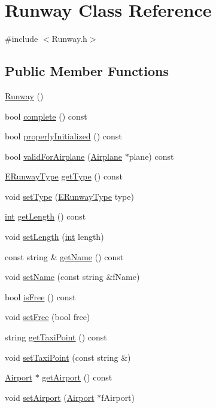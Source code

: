 \hypertarget{classRunway}{}\section{Runway Class Reference}
\label{classRunway}


{\ttfamily \#include $<$Runway.\+h$>$}

\subsection*{Public Member Functions}
\begin{DoxyCompactItemize}
\item 
\hyperlink{classRunway_a75b9355b4953bd430f7c6ea0a18b465a}{Runway} ()
\item 
bool \hyperlink{classRunway_a3f905e251e1c7941690cf89c1fabd04c}{complete} () const 
\item 
bool \hyperlink{classRunway_ab1eb6649c04ead1c6ba6405b0d6e2a9f}{properly\+Initialized} () const 
\item 
bool \hyperlink{classRunway_a54aa6c5f9054cc5d16c10257c641f997}{valid\+For\+Airplane} (\hyperlink{classAirplane}{Airplane} $\ast$plane) const 
\item 
\hyperlink{Runway_8h_adbb3e23fdb96fa1bac0dbbae33431cd2}{E\+Runway\+Type} \hyperlink{classRunway_a6d936a840916f8a5fe01551622cf6c46}{get\+Type} () const 
\item 
void \hyperlink{classRunway_a0a95f11d67cb4677f1bddd8cf20ed5bc}{set\+Type} (\hyperlink{Runway_8h_adbb3e23fdb96fa1bac0dbbae33431cd2}{E\+Runway\+Type} type)
\item 
\hyperlink{CMakeCache_8txt_a79a3d8790b2588b09777910863574e09}{int} \hyperlink{classRunway_ab22377036fde6582fa86441e73ad69d2}{get\+Length} () const 
\item 
void \hyperlink{classRunway_af32954dc4688acd3a91114d200c6df9e}{set\+Length} (\hyperlink{CMakeCache_8txt_a79a3d8790b2588b09777910863574e09}{int} length)
\item 
const string \& \hyperlink{classRunway_a2934c38f3af6080f7b40c306a27c57cd}{get\+Name} () const 
\item 
void \hyperlink{classRunway_ae346a0e299a7cbea186ad6ab25a46ae0}{set\+Name} (const string \&f\+Name)
\item 
bool \hyperlink{classRunway_a7696b8546ad5ba33d401d7ba740c5936}{is\+Free} () const 
\item 
void \hyperlink{classRunway_aa93f02e87a66d6ac6ff49ebaf6919216}{set\+Free} (bool free)
\item 
string \hyperlink{classRunway_ad2d8fd5696ec93e2fa3d32bec3d02f59}{get\+Taxi\+Point} () const 
\item 
void \hyperlink{classRunway_a99a62b2993713ffc18e88cae16c11d11}{set\+Taxi\+Point} (const string \&)
\item 
\hyperlink{classAirport}{Airport} $\ast$ \hyperlink{classRunway_a8a16d41a8c65a85e433d96faafb5de06}{get\+Airport} () const 
\item 
void \hyperlink{classRunway_a41fd8ad7313e7b667853869854bdc4e6}{set\+Airport} (\hyperlink{classAirport}{Airport} $\ast$f\+Airport)
\end{DoxyCompactItemize}


